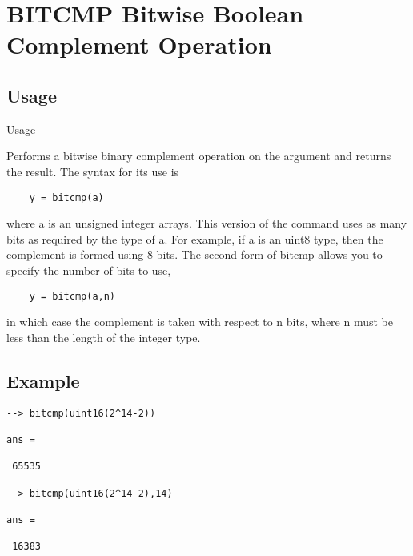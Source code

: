 \section{BITCMP Bitwise Boolean Complement Operation}

\subsection{Usage}

 Usage
 
 Performs a bitwise binary complement operation on the argument and
 returns the result.  The syntax for its use is
\begin{verbatim}
    y = bitcmp(a)
\end{verbatim}
 where a is an unsigned integer arrays.  This version of the command
 uses as many bits as required by the type of a.  For example, if 
 a is an uint8 type, then the complement is formed using 8 bits.
 The second form of bitcmp allows you to specify the number of bits
 to use, 
\begin{verbatim}
    y = bitcmp(a,n)
\end{verbatim}
 in which case the complement is taken with respect to n bits, where n must be 
 less than the length of the integer type.

\subsection{Example}

\begin{verbatim}
--> bitcmp(uint16(2^14-2))

ans = 

 65535 

--> bitcmp(uint16(2^14-2),14)

ans = 

 16383 
\end{verbatim}
